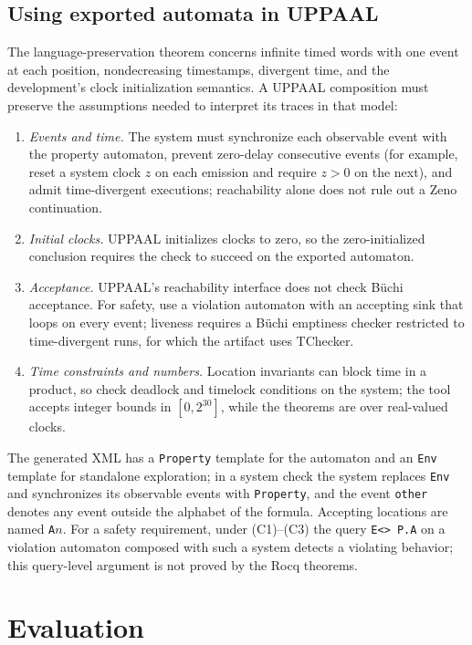 \documentclass[preprint,12pt]{elsarticle}
\let\pathfragile\path
\DeclareRobustCommand\path{\pathfragile}
\begin{document}
\subsection{Using exported automata in UPPAAL}
The language-preservation theorem concerns infinite timed words with one event at each position, nondecreasing timestamps, divergent time, and the development's clock initialization semantics. A UPPAAL composition must preserve the assumptions needed to interpret its traces in that model:
\begin{enumerate}[label=(C\arabic*),leftmargin=*,itemsep=0pt]
  \item \emph{Events and time.} The system must synchronize each observable event with the property automaton, prevent zero-delay consecutive events (for example, reset a system clock $z$ on each emission and require $z>0$ on the next), and admit time-divergent executions; reachability alone does not rule out a Zeno continuation.
  \item \emph{Initial clocks.} UPPAAL initializes clocks to zero, so the zero-initialized conclusion requires the  check to succeed on the exported automaton.
  \item \emph{Acceptance.} UPPAAL's reachability interface does not check B\"uchi acceptance. For safety, use a violation automaton with an accepting sink that loops on every event; liveness requires a B\"uchi emptiness checker restricted to time-divergent runs, for which the artifact uses TChecker.
  \item \emph{Time constraints and numbers.} Location invariants can block time in a product, so check deadlock and timelock conditions on the system; the tool accepts integer bounds in $[0,2^{30}]$, while the theorems are over real-valued clocks.
\end{enumerate}
The generated XML has a \texttt{Property} template for the automaton and an \texttt{Env} template for standalone exploration; in a system check the system replaces \texttt{Env} and synchronizes its observable events with \texttt{Property}, and the event \texttt{other} denotes any event outside the alphabet of the formula. Accepting locations are named \texttt{A}$n$. For a safety requirement, under (C1)--(C3) the query \texttt{E<> P.A} on a violation automaton composed with such a system detects a violating behavior; this query-level argument is not proved by the Rocq theorems.

\section{Evaluation}
\label{sec:evaluation}

\end{document}
